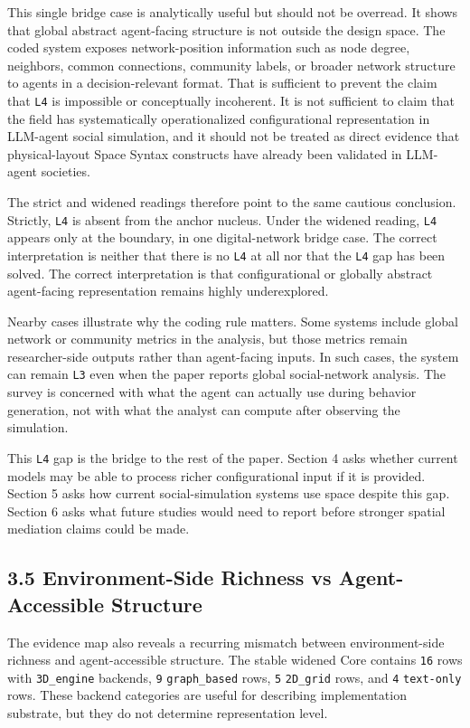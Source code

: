 \documentclass[
  twocolumn]{article}
\begin{document}
This single bridge case is analytically useful but should not be
overread. It shows that global abstract agent-facing structure is not
outside the design space. The coded system exposes network-position
information such as node degree, neighbors, common connections,
community labels, or broader network structure to agents in a
decision-relevant format. That is sufficient to prevent the claim that
\texttt{L4} is impossible or conceptually incoherent. It is not
sufficient to claim that the field has systematically operationalized
configurational representation in LLM-agent social simulation, and it
should not be treated as direct evidence that physical-layout Space
Syntax constructs have already been validated in LLM-agent societies.

The strict and widened readings therefore point to the same cautious
conclusion. Strictly, \texttt{L4} is absent from the anchor nucleus.
Under the widened reading, \texttt{L4} appears only at the boundary, in
one digital-network bridge case. The correct interpretation is neither
that there is no \texttt{L4} at all nor that the \texttt{L4} gap has
been solved. The correct interpretation is that configurational or
globally abstract agent-facing representation remains highly
underexplored.

Nearby cases illustrate why the coding rule matters. Some systems
include global network or community metrics in the analysis, but those
metrics remain researcher-side outputs rather than agent-facing inputs.
In such cases, the system can remain \texttt{L3} even when the paper
reports global social-network analysis. The survey is concerned with
what the agent can actually use during behavior generation, not with
what the analyst can compute after observing the simulation.

This \texttt{L4} gap is the bridge to the rest of the paper. Section 4
asks whether current models may be able to process richer
configurational input if it is provided. Section 5 asks how current
social-simulation systems use space despite this gap. Section 6 asks
what future studies would need to report before stronger spatial
mediation claims could be made.

\subsection{3.5 Environment-Side Richness vs Agent-Accessible
Structure}\label{environment-side-richness-vs-agent-accessible-structure}

The evidence map also reveals a recurring mismatch between
environment-side richness and agent-accessible structure. The stable
widened Core contains \texttt{16} rows with \texttt{3D\_engine}
backends, \texttt{9} \texttt{graph\_based} rows, \texttt{5}
\texttt{2D\_grid} rows, and \texttt{4} \texttt{text-only} rows. These
backend categories are useful for describing implementation substrate,
but they do not determine representation level.
\end{document}
